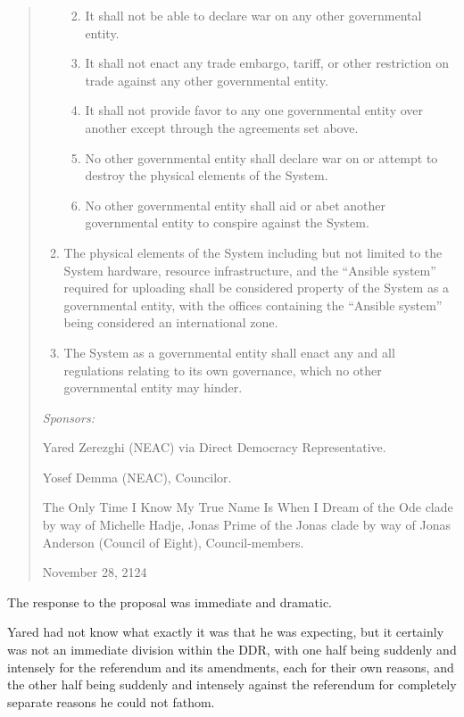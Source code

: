 \begin{quote}
\begin{enumerate}
  \begin{enumerate}
  \def\labelenumii{\arabic{enumii}.}
  \tightlist
  \item
    It shall not be able to declare war on any other governmental entity.
  \item
    It shall not enact any trade embargo, tariff, or other restriction on trade against any other governmental entity.
  \item
    It shall not provide favor to any one governmental entity over another except through the agreements set above.
  \item
    No other governmental entity shall declare war on or attempt to destroy the physical elements of the System.
  \item
    No other governmental entity shall aid or abet another governmental entity to conspire against the System.
  \end{enumerate}
\item
  The physical elements of the System including but not limited to the System hardware, resource infrastructure, and the ``Ansible system'' required for uploading shall be considered property of the System as a governmental entity, with the offices containing the ``Ansible system'' being considered an international zone.
\item
  The System as a governmental entity shall enact any and all regulations relating to its own governance, which no other governmental entity may hinder.
\end{enumerate}

\emph{Sponsors:}

\begin{description}
\tightlist
\item[Direct Democracy Representative signatory]
Yared Zerezghi (NEAC) via Direct Democracy Representative.
\item[Supervisory government signatory]
Yosef Demma (NEAC), Councilor.
\item[System-side signatories]
The Only Time I Know My True Name Is When I Dream of the Ode clade by way of Michelle Hadje, Jonas Prime of the Jonas clade by way of Jonas Anderson (Council of Eight), Council-members.
\end{description}

November 28, 2124
\end{quote}

The response to the proposal was immediate and dramatic.

Yared had not know what exactly it was that he was expecting, but it certainly was not an immediate division within the DDR, with one half being suddenly and intensely for the referendum and its amendments, each for their own reasons, and the other half being suddenly and intensely against the referendum for completely separate reasons he could not fathom.

